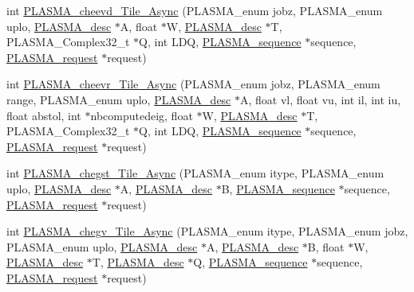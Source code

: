 \begin{DoxyCompactItemize}
\item 
int \hyperlink{group__PLASMA__Complex32__t__Tile__Async_gafd6671ba8fb3ead44a9e0e434bdd23a2_gafd6671ba8fb3ead44a9e0e434bdd23a2}{P\+L\+A\+S\+M\+A\+\_\+cheevd\+\_\+\+Tile\+\_\+\+Async} (P\+L\+A\+S\+M\+A\+\_\+enum jobz, P\+L\+A\+S\+M\+A\+\_\+enum uplo, \hyperlink{structplasma__desc__t}{P\+L\+A\+S\+M\+A\+\_\+desc} $\ast$A, float $\ast$W, \hyperlink{structplasma__desc__t}{P\+L\+A\+S\+M\+A\+\_\+desc} $\ast$T, P\+L\+A\+S\+M\+A\+\_\+\+Complex32\+\_\+t $\ast$Q, int L\+D\+Q, \hyperlink{structplasma__sequence__t}{P\+L\+A\+S\+M\+A\+\_\+sequence} $\ast$sequence, \hyperlink{structplasma__request__t}{P\+L\+A\+S\+M\+A\+\_\+request} $\ast$request)
\item 
int \hyperlink{group__PLASMA__Complex32__t__Tile__Async_gadf8cade3f576c8d0404fdef34ff0daab_gadf8cade3f576c8d0404fdef34ff0daab}{P\+L\+A\+S\+M\+A\+\_\+cheevr\+\_\+\+Tile\+\_\+\+Async} (P\+L\+A\+S\+M\+A\+\_\+enum jobz, P\+L\+A\+S\+M\+A\+\_\+enum range, P\+L\+A\+S\+M\+A\+\_\+enum uplo, \hyperlink{structplasma__desc__t}{P\+L\+A\+S\+M\+A\+\_\+desc} $\ast$A, float vl, float vu, int il, int iu, float abstol, int $\ast$nbcomputedeig, float $\ast$W, \hyperlink{structplasma__desc__t}{P\+L\+A\+S\+M\+A\+\_\+desc} $\ast$T, P\+L\+A\+S\+M\+A\+\_\+\+Complex32\+\_\+t $\ast$Q, int L\+D\+Q, \hyperlink{structplasma__sequence__t}{P\+L\+A\+S\+M\+A\+\_\+sequence} $\ast$sequence, \hyperlink{structplasma__request__t}{P\+L\+A\+S\+M\+A\+\_\+request} $\ast$request)
\item 
int \hyperlink{group__PLASMA__Complex32__t__Tile__Async_ga10f32270e2c1574a884ad5f10084f753_ga10f32270e2c1574a884ad5f10084f753}{P\+L\+A\+S\+M\+A\+\_\+chegst\+\_\+\+Tile\+\_\+\+Async} (P\+L\+A\+S\+M\+A\+\_\+enum itype, P\+L\+A\+S\+M\+A\+\_\+enum uplo, \hyperlink{structplasma__desc__t}{P\+L\+A\+S\+M\+A\+\_\+desc} $\ast$A, \hyperlink{structplasma__desc__t}{P\+L\+A\+S\+M\+A\+\_\+desc} $\ast$B, \hyperlink{structplasma__sequence__t}{P\+L\+A\+S\+M\+A\+\_\+sequence} $\ast$sequence, \hyperlink{structplasma__request__t}{P\+L\+A\+S\+M\+A\+\_\+request} $\ast$request)
\item 
int \hyperlink{group__PLASMA__Complex32__t__Tile__Async_ga2141f44246dd9981e0d2f96327f65e2e_ga2141f44246dd9981e0d2f96327f65e2e}{P\+L\+A\+S\+M\+A\+\_\+chegv\+\_\+\+Tile\+\_\+\+Async} (P\+L\+A\+S\+M\+A\+\_\+enum itype, P\+L\+A\+S\+M\+A\+\_\+enum jobz, P\+L\+A\+S\+M\+A\+\_\+enum uplo, \hyperlink{structplasma__desc__t}{P\+L\+A\+S\+M\+A\+\_\+desc} $\ast$A, \hyperlink{structplasma__desc__t}{P\+L\+A\+S\+M\+A\+\_\+desc} $\ast$B, float $\ast$W, \hyperlink{structplasma__desc__t}{P\+L\+A\+S\+M\+A\+\_\+desc} $\ast$T, \hyperlink{structplasma__desc__t}{P\+L\+A\+S\+M\+A\+\_\+desc} $\ast$Q, \hyperlink{structplasma__sequence__t}{P\+L\+A\+S\+M\+A\+\_\+sequence} $\ast$sequence, \hyperlink{structplasma__request__t}{P\+L\+A\+S\+M\+A\+\_\+request} $\ast$request)

\end{DoxyCompactItemize}
